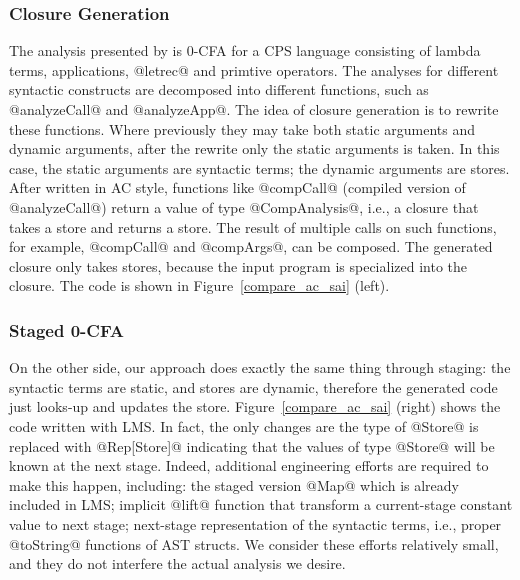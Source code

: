 \subsubsection{Closure Generation}

The analysis presented by \citeauthor{Boucher:1996:ACN:647473.727587} is 0-CFA
for a CPS language consisting of lambda terms, applications, @letrec@ and
primtive operators. The analyses for different syntactic constructs are
decomposed into different functions, such as @analyzeCall@ and @analyzeApp@. The
idea of closure generation is to rewrite these functions. Where previously they
may take both static arguments and dynamic arguments, after the rewrite only the
static arguments is taken. In this case, the static arguments are syntactic
terms; the dynamic arguments are stores. After written in AC style, functions
like @compCall@ (compiled version of @analyzeCall@) return a value of type
@CompAnalysis@, i.e., a closure that takes a store and returns a store. The
result of multiple calls on such functions, for example, @compCall@ and
@compArgs@, can be composed. The generated closure only takes stores, because
the input program is specialized into the closure. The code is shown in
Figure~\ref{compare_ac_sai} (left).

\subsubsection{Staged 0-CFA}

On the other side, our approach does exactly the same thing through staging: the
syntactic terms are static, and stores are dynamic, therefore the generated code
just looks-up and updates the store. Figure~\ref{compare_ac_sai} (right) shows
the code written with LMS. In fact, the only changes are the type of @Store@ is
replaced with @Rep[Store]@ indicating that the values of type @Store@ will be
known at the next stage. Indeed, additional engineering efforts are required to
make this happen, including: the staged version @Map@ which is already included
in LMS; implicit @lift@ function that transform a current-stage constant value
to next stage; next-stage representation of the syntactic terms, i.e., proper
@toString@ functions of AST structs. We consider these efforts relatively small,
and they do not interfere the actual analysis we desire.


